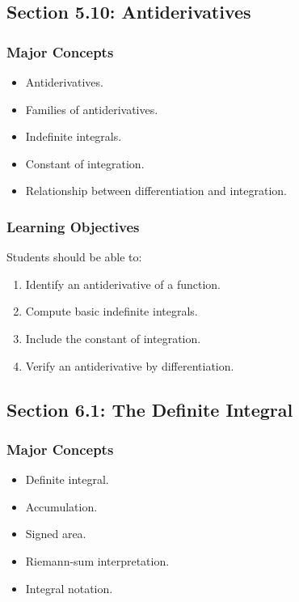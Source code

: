 \documentclass[11pt]{article}
\begin{document}
\subsection{Section 5.10: Antiderivatives}

\subsubsection{Major Concepts}

\begin{itemize}
    \item Antiderivatives.
    \item Families of antiderivatives.
    \item Indefinite integrals.
    \item Constant of integration.
    \item Relationship between differentiation and integration.
\end{itemize}

\subsubsection{Learning Objectives}

Students should be able to:

\begin{enumerate}
    \item Identify an antiderivative of a function.
    \item Compute basic indefinite integrals.
    \item Include the constant of integration.
    \item Verify an antiderivative by differentiation.
\end{enumerate}

\subsection{Section 6.1: The Definite Integral}

\subsubsection{Major Concepts}

\begin{itemize}
    \item Definite integral.
    \item Accumulation.
    \item Signed area.
    \item Riemann-sum interpretation.
    \item Integral notation.
\end{itemize}
\end{document}
